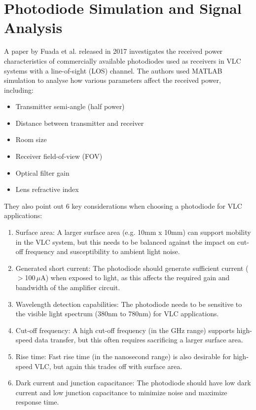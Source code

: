 \section{Photodiode Simulation and Signal Analysis}
A paper by Fuada et al. released in 2017 investigates the received power characteristics of commercially available photodiodes used as receivers in \ac{VLC} systems with a line-of-sight (LOS) channel. 
The authors used MATLAB simulation to analyse how various parameters affect the received power, including:
\begin{itemize}
\item Transmitter semi-angle (half power)
\item Distance between transmitter and receiver
\item Room size
\item Receiver field-of-view (FOV)
\item Optical filter gain
\item Lens refractive index
\end{itemize}

They also point out 6 key considerations when choosing a photodiode for \ac{VLC} applications:
\begin{enumerate}
\item Surface area: A larger surface area (e.g. 10mm x 10mm) can support mobility in the VLC system, but this needs to be balanced against the impact on cut-off frequency and susceptibility to ambient light noise.
\item Generated short current: The photodiode should generate sufficient current ($>$100\,$\mu$A) when exposed to light, as this affects the required gain and bandwidth of the amplifier circuit.

\item Wavelength detection capabilities: The photodiode needs to be sensitive to the visible light spectrum (380nm to 780nm) for VLC applications.

\item Cut-off frequency: A high cut-off frequency (in the GHz range) supports high-speed data transfer, but this often requires sacrificing a larger surface area.

\item Rise time: Fast rise time (in the nanosecond range) is also desirable for high-speed VLC, but again this trades off with surface area.

\item Dark current and junction capacitance: The photodiode should have low dark current and low junction capacitance to minimize noise and maximize response time.
\end{enumerate}


